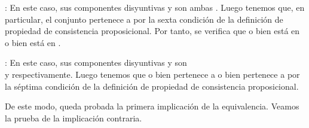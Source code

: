 \begin{isabellebody}
\begin{isamarkuptext}
\begin{demostracion}
  : En este caso, sus componentes disyuntivas  y  son ambas 
    . Luego tenemos que, en particular, el conjunto  pertenece a  por la 
    sexta condición de la definición de propiedad de consistencia proposicional. Por tanto, se 
    verifica que o bien  está en  o bien  está en .

  : En este caso, sus componentes disyuntivas  y  son \\ 
     y  respectivamente. Luego tenemos que o bien  pertenece a  o 
    bien  pertenece a  por la séptima condición de la definición de propiedad 
    de consistencia proposicional.

  De este modo, queda probada la primera implicación de la equivalencia. Veamos la prueba de la 
  implicación contraria.

\textbf{}


\end{demostracion}
\end{isamarkuptext}
\end{isabellebody}
